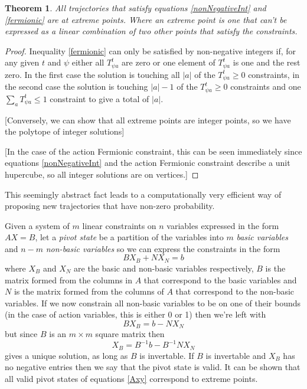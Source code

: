 \documentclass{article}
\newtheorem{theorem}{Theorem}
\begin{document}
\begin{theorem}
	All trajectories that satisfy equations \ref{nonNegativeInt} and \ref{fermionic} are at extreme points. Where an extreme point is one that can't be expressed as a linear combination of two other points that satisfy the constraints.
\end{theorem}
\begin{proof}
	
	Inequality \ref{fermionic} can only be satisfied by non-negative integers if, for any given $t$ and $\psi$ either all $T^t_{\psi a}$ are zero or one element of $T^t_{\psi a}$ is one and the rest zero. In the first case the solution is touching all $|a|$ of the $T^t_{\psi a} \ge 0$ constraints, in the second case the solution is touching $|a|-1$ of the $T^t_{\psi a} \ge 0$ constraints and one $\sum_a T^t_{\psi a} \le 1$ constraint to give a total of $|a|$.
	
	[Conversely, we can show that all extreme points are integer points, so we have the polytope of integer solutions]
	
	[In the case of the action Fermionic constraint, this can be seen immediately since equations \ref{nonNegativeInt} and the action Fermionic constraint describe a unit hupercube, so all integer solutions are on vertices.]
	
\end{proof}


This seemingly abstract fact leads to a computationally very efficient way of proposing new trajectories that have non-zero probability.


Given a system of $m$ linear constraints on $n$ variables expressed in the form $AX=B$, let a \textit{pivot state} be a partition of the variables into $m$ \textit{basic variables} and $n-m$ \textit{non-basic variables} so we can express the constraints in the form
\begin{equation}
BX_B + NX_N = b
\label{tableau1}
\end{equation}
where $X_B$ and $X_N$ are the basic and non-basic variables respectively, $B$ is the matrix formed from the columns in $A$ that correspond to the basic variables and $N$ is the matrix formed from the columns of $A$ that correspond to the non-basic variables. If we now constrain all non-basic variables to be on one of their bounds (in the case of action variables, this is either 0 or 1) then we're left with
\[
BX_B = b - NX_N
\]
but since $B$ is an $m \times m$ square matrix then 
\[
X_B = B^{-1}b - B^{-1}NX_N
\]
gives a unique solution, as long as $B$ is invertable. If $B$ is invertable and $X_B$ has no negative entries then we say that the pivot state is valid. It can be shown that all valid pivot states of equations \ref{Axy} correspond to extreme points\cite{dantzig1955generalized}.
\end{document}
